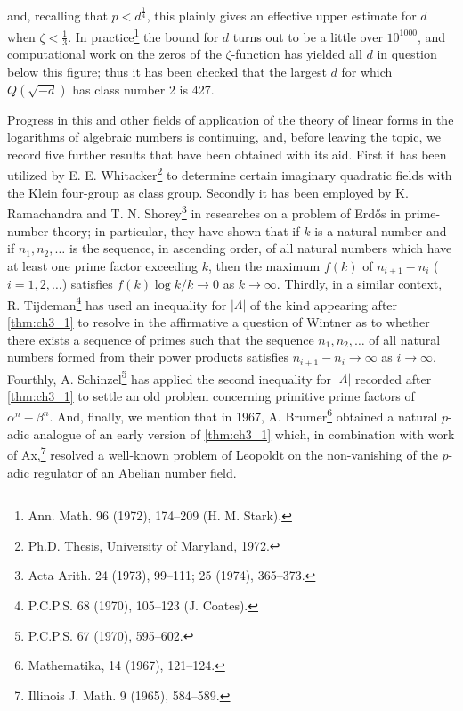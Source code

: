 and, recalling that $p < d^{\frac{1}{4}}$, this plainly gives an effective upper estimate for $d$ when $\zeta < \frac{1}{3}$. In practice\footnote{Ann. Math. 96 (1972), 174--209 (H. M. Stark).} the bound for $d$ turns out to be a little over $10^{1000}$, and computational work on the zeros of the $\zeta$-function has yielded all $d$ in question below this figure; thus it has been checked that the largest $d$ for which $Q(\sqrt{-d})$ has class number 2 is 427.

Progress in this and other fields of application of the theory of linear forms in the logarithms of algebraic numbers is continuing, and, before leaving the topic, we record five further results that have been obtained with its aid. First it has been utilized by E. E. Whitacker\footnote{Ph.D. Thesis, University of Maryland, 1972.} to determine certain imaginary quadratic fields with the Klein four-group as class group. Secondly it has been employed by K. Ramachandra and T. N. Shorey\footnote{Acta Arith. 24 (1973), 99--111; 25 (1974), 365--373.} in researches on a problem of Erdős in prime-number theory; in particular, they have shown that if $k$ is a natural number and if $n_1, n_2, \dots$ is the sequence, in ascending order, of all natural numbers which have at least one prime factor exceeding $k$, then the maximum $f(k)$ of $n_{i+1} - n_i$ ($i = 1, 2, \dots$) satisfies $f(k) \log k/k \to 0$ as $k \to \infty$. Thirdly, in a similar context, R. Tijdeman\footnote{P.C.P.S. 68 (1970), 105--123 (J. Coates).} has used an inequality for $|\Lambda|$ of the kind appearing after \autoref{thm:ch3_1} to resolve in the affirmative a question of Wintner as to whether there exists a sequence of primes such that the sequence $n_1, n_2, \dots$ of all natural numbers formed from their power products satisfies $n_{i+1} - n_i \to \infty$ as $i \to \infty$. Fourthly, A. Schinzel\footnote{P.C.P.S. 67 (1970), 595--602.} has applied the second inequality for $|\Lambda|$ recorded after \autoref{thm:ch3_1} to settle an old problem concerning primitive prime factors of $\alpha^n - \beta^n$. And, finally, we mention that in 1967, A. Brumer\footnote{Mathematika, 14 (1967), 121--124.} obtained a natural $p$-adic analogue of an early version of \autoref{thm:ch3_1} which, in combination with work of Ax,\footnote{Illinois J. Math. 9 (1965), 584--589.} resolved a well-known problem of Leopoldt on the non-vanishing of the $p$-adic regulator of an Abelian number field.
